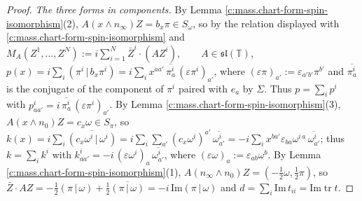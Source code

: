 \documentclass[11pt]{article}
\theoremstyle{definition}
\theoremstyle{plain}
\providecommand{\Som}{}\renewcommand{\Som}{S_\omega}
\providecommand{\Spi}{}\renewcommand{\Spi}{S_\pi}
\providecommand{\T}{}\renewcommand{\T}{\mathbb{T}}
\providecommand{\tr}{}\renewcommand{\tr}{\operatorname{tr}}
\providecommand{\hp}{}\renewcommand{\hp}[2]{( #1 \,|\, #2 )}
\begin{document}
\begin{proof}
\emph{The three forms in components.} By Lemma \ref{c:mass.chart-form-spin-isomorphism}(2), $A(x\wedge n_{\infty})Z = b_{x}\pi \in \Som$, so by the relation displayed with \ref{c:mass.chart-form-spin-isomorphism} and $M_{A}(Z^{1}, \dots, Z^{N}) := i\sum_{i=1}^{N} \bar{Z}^{i}\cdot(A Z^{i}), \qquad A \in \mathfrak{sl}(\T)$, $p(x) = i\sum_{i}\hp{\pi^{i}}{b_{x}\pi^{i}} = i\sum_{i} x^{aa'}\,\overline{\pi^{i}_{a}}\,(\varepsilon\pi^{i})_{a'}$, where $(\varepsilon\pi)_{a'} := \varepsilon_{a'b'}\pi^{b'}$ and $\overline{\pi^{i}_{a}}$ is the conjugate of the component of $\pi^{i}$ paired with $e_{a}$ by $\Sigma$. Thus $p = \sum_{i}p^{i}$ with $p^{i}_{aa'} = i\,\overline{\pi^{i}_{a}}\,(\varepsilon\pi^{i})_{a'}$. By Lemma \ref{c:mass.chart-form-spin-isomorphism}(3), $A(x\wedge n_{0})Z = c_{x}\omega \in \Spi$, so $k(x) = i\sum_{i}\overline{\hp{c_{x}\omega^{i}}{\omega^{i}}} = i\sum_{i}\sum_{a'}(c_{x}\omega^{i})^{a'}\,\overline{\omega^{i}_{a'}} = -i\sum_{i}x^{ba'}\varepsilon_{ba}\omega^{i\,a}\,\overline{\omega^{i}_{a'}}$; thus $k = \sum_{i}k^{i}$ with $k^{i}_{aa'} = -i\,(\varepsilon\omega^{i})_{a}\,\overline{\omega^{i}_{a'}}$, where $(\varepsilon\omega)_{a} := \varepsilon_{ab}\omega^{b}$. By Lemma \ref{c:mass.chart-form-spin-isomorphism}(1), $A(n_{\infty}\wedge n_{0})Z = (-\tfrac12\omega, \tfrac12\pi)$, so $\bar{Z}\cdot AZ = -\tfrac12\hp{\pi}{\omega} + \tfrac12\overline{\hp{\pi}{\omega}} = -i\,\mathrm{Im}\hp{\pi}{\omega}$ and $d = \sum_{i}\mathrm{Im}\,t_{ii} = \mathrm{Im}\tr t$.


\end{proof}
\end{document}
